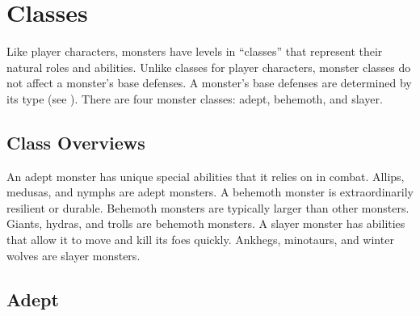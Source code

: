 \chapter{Classes}\label{Classes}

Like player characters, monsters have levels in ``classes'' that represent their natural roles and abilities.
Unlike classes for player characters, monster classes do not affect a monster's base defenses.
A monster's base defenses are determined by its type (see ).
There are four monster classes: adept, behemoth, and slayer.

\section{Class Overviews}

     An adept monster has unique special abilities that it relies on in combat.
    Allips, medusas, and nymphs are adept monsters.
     A behemoth monster is extraordinarily resilient or durable.
    Behemoth monsters are typically larger than other monsters.
    Giants, hydras, and trolls are behemoth monsters.
     A slayer monster has abilities that allow it to move and kill its foes quickly.
    Ankhegs, minotaurs, and winter wolves are slayer monsters.

\section{Adept}\label{Adept}

